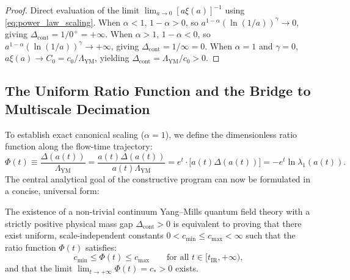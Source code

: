 \begin{proof}
Direct evaluation of the limit $\lim_{a \to 0} [a \xi(a)]^{-1}$ using \eqref{eq:power_law_scaling}. When $\alpha < 1$, $1 - \alpha > 0$, so $a^{1-\alpha} (\ln(1/a))^\gamma \to 0$, giving $\Delta_{\mathrm{cont}} = 1/0^+ = +\infty$. When $\alpha > 1$, $1 - \alpha < 0$, so $a^{1-\alpha} (\ln(1/a))^\gamma \to +\infty$, giving $\Delta_{\mathrm{cont}} = 1/\infty = 0$. When $\alpha = 1$ and $\gamma = 0$, $a \xi(a) \to C_0 = c_0 / \Lambda_{\mathrm{YM}}$, yielding $\Delta_{\mathrm{cont}} = \Lambda_{\mathrm{YM}} / c_0 > 0$.
\end{proof}

\subsection{The Uniform Ratio Function and the Bridge to Multiscale Decimation}
\label{subsec:ratio_function_bridge}

To establish exact canonical scaling ($\alpha = 1$), we define the dimensionless ratio function along the flow-time trajectory:
\begin{equation}
\label{eq:ratio_function_def}
\Phi(t) \equiv \frac{\Delta(a(t))}{\Lambda_{\mathrm{YM}}} = \frac{a(t) \Delta(a(t))}{a(t) \Lambda_{\mathrm{YM}}} = e^t \cdot \bigl[ a(t) \Delta(a(t)) \bigr] = -e^t \ln \lambda_1(a(t)).
\end{equation}
The central analytical goal of the constructive program can now be formulated in a concise, universal form:

\begin{theorem}
\label{thm:mass_gap_equivalence}
The existence of a non-trivial continuum Yang--Mills quantum field theory with a strictly positive physical mass gap $\Delta_{\mathrm{cont}} > 0$ is equivalent to proving that there exist uniform, scale-independent constants $0 < c_{\min} \le c_{\max} < \infty$ such that the ratio function $\Phi(t)$ satisfies:
\begin{equation}
\label{eq:uniform_ratio_bounds}
c_{\min} \le \Phi(t) \le c_{\max} \qquad \text{for all } t \in [t_{\mathrm{IR}}, +\infty),
\end{equation}
and that the limit $\lim_{t \to +\infty} \Phi(t) = c_* > 0$ exists.
\end{theorem}


